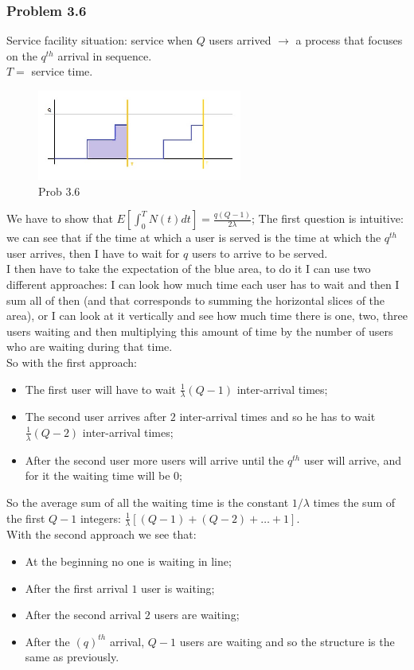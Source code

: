 \documentclass[a4paper, 12pt, openright]{book}
\theoremstyle{theoremdd}
\theoremstyle{remark}
\begin{document}
\subsubsection*{Problem 3.6}
Service facility situation: service when $Q$ users arrived $\rightarrow$ a process that focuses on the $q^{th}$ arrival in sequence.\\
$T = $ service time.
\begin{figure}
\centering
\includegraphics[width = 0.6\textwidth]{Cri_scale.jpg}
\caption{Prob 3.6}
\end{figure}
We have to show that $E[\int_{0}^{T}N(t)dt] = \frac{q(Q-1)}{2\lambda}$; The first question is intuitive: we can see that if the time at which a user is served is the time at which the $q^{th}$ user arrives, then I have to wait for $q$ users to arrive to be served.\\
I then have to take the expectation of the blue area, to do it I can use two different approaches: I can look how much time each user has to wait and then I sum all of then (and that corresponds to summing the horizontal slices of the area), or I can look at it vertically and see how much time there is one, two, three users waiting and then multiplying this amount of time by the number of users who are waiting during that time.\\
So with the first approach:
\begin{itemize}
\item The first user will have to wait $\frac{1}{\lambda}(Q-1)$ inter-arrival times;
\item The second user arrives after $2$ inter-arrival times and so he has to wait $\frac{1}{\lambda }(Q-2)$ inter-arrival times; 
\item After the second user more users will arrive until the $q^{th}$ user will arrive, and for it the waiting time will be $0$;
\end{itemize}
So the average sum of all the waiting time is the constant $1/\lambda$ times  the sum of the first $Q-1$ integers: $\frac{1}{\lambda}[(Q-1)+(Q-2)+\dots+1]$.\\
With the second approach we see that:
\begin{itemize}
\item At the beginning no one is waiting in line;
\item After the first arrival $1$ user is waiting;
\item After the second arrival $2$ users are waiting;
\item After the $(q)^{th}$ arrival, $Q-1$ users are waiting and so the structure is the same as previously.
\end{itemize}
\end{document}
